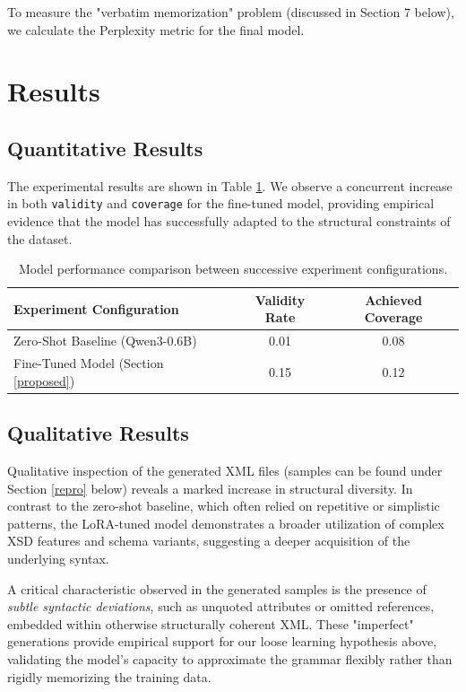 \documentclass[11pt]{article}
\begin{document}
To measure the "verbatim memorization" problem (discussed in Section 7 below), we calculate the Perplexity metric for the final model.

\section{Results}

\subsection{Quantitative Results}

The experimental results are shown in Table \ref{perf}. We observe a concurrent increase in both \texttt{validity} and \texttt{coverage} for the fine-tuned model, providing empirical evidence that the model has successfully adapted to the structural constraints of the dataset.

\begin{table}
  \centering
  \begin{tabular}{lcc}
    \hline
    \textbf{Experiment Configuration} & \textbf{Validity Rate} & \textbf{Achieved Coverage} \\
    \hline
    Zero-Shot Baseline (Qwen3-0.6B)     & 0.01     & 0.08      \\
    Fine-Tuned Model (Section \ref{proposed})  & 0.15  & 0.12       \\
    \hline
  \end{tabular}
  \caption{\label{perf}
    Model performance comparison between successive experiment configurations.
  }
\end{table}

\subsection{Qualitative Results}

Qualitative inspection of the generated XML files (samples can be found under Section \ref{repro} below) reveals a marked increase in structural diversity. In contrast to the zero-shot baseline, which often relied on repetitive or simplistic patterns, the LoRA-tuned model demonstrates a broader utilization of complex XSD features and schema variants, suggesting a deeper acquisition of the underlying syntax.

A critical characteristic observed in the generated samples is the presence of \textit{subtle syntactic deviations}, such as unquoted attributes or omitted references, embedded within otherwise structurally coherent XML. These "imperfect" generations provide empirical support for our loose learning hypothesis above, validating the model's capacity to approximate the grammar flexibly rather than rigidly memorizing the training data.
\end{document}
